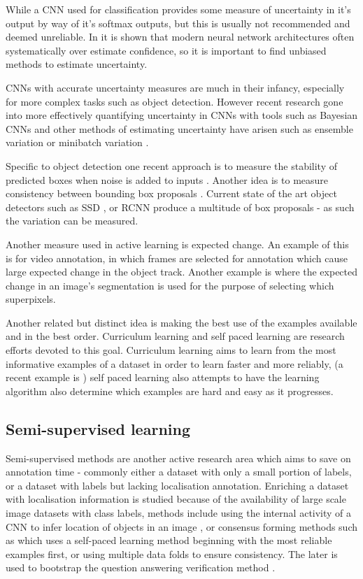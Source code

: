 While a \gls{CNN} used for classification provides some measure of uncertainty in it's output by way of it's softmax outputs, but this is usually not recommended and deemed unreliable. In \cite{Guo2017} it is shown that modern neural network architectures often systematically over estimate confidence, so it is important to find unbiased methods to estimate uncertainty.

\gls{CNN}s with accurate uncertainty measures are much in their infancy, especially for more complex tasks such as object detection. However recent research gone into more effectively quantifying uncertainty in \gls{CNN}s with tools such as Bayesian \gls{CNN}s \cite{Gal2017} and other methods of estimating uncertainty have arisen such as ensemble variation \cite{Beluch2018} or minibatch variation \cite{Chang2017}. 

Specific to object detection one recent approach is to measure the stability of predicted boxes when noise is added to inputs \cite{Kao2018}. Another idea is to measure consistency between bounding box proposals \cite{Kao2018, Brust2018, Le2018}. Current state of the art object detectors such as \gls{SSD} \cite{Liu2016a}, or \gls{RCNN} \cite{Wang2011a} produce a multitude of box proposals - as such the variation can be measured.

Another measure used in active learning is expected change. An example of this is \cite{Vondrick2011} for video annotation, in which frames are selected for annotation which cause large expected change in the object track. Another example is \cite{Xu2017} where the expected change in an image's segmentation is used for the purpose of selecting which superpixels. 

Another related but distinct idea is making the best use of the examples available and in the best order. Curriculum learning and self paced learning \cite{Kumar2010} are research efforts devoted to this goal. Curriculum learning aims to learn from the most informative examples of a dataset in order to learn faster and more reliably, (a recent example is \cite{Katharopoulos2018}) self paced learning also attempts to have the learning algorithm also determine which examples are hard and easy as it progresses.


\subsection{Semi-supervised learning}

Semi-supervised methods are another active research area which aims to save on annotation time - commonly either a dataset with only a small portion of labels, or a dataset with labels but lacking localisation annotation. Enriching a dataset with localisation information is studied because of the availability of large scale image datasets with class labels, methods include using the internal activity of a \gls{CNN} to infer location of objects in an image \cite{Sivic2015}, or consensus forming methods such as \cite{Sangineto} which uses a self-paced learning method beginning with the most reliable examples first, or \cite{Cinbis2017} using multiple data folds to ensure consistency. The later is used to bootstrap the question answering verification method \cite{Papadopoulos2016}.

